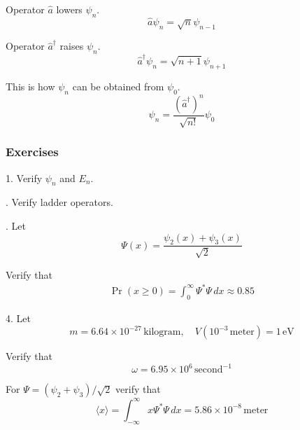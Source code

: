 Operator $\hat a$ lowers $\psi_n$.
\begin{equation*}
\hat a\psi_n=\sqrt n\psi_{n-1}
\end{equation*}

Operator $\hat a^\dag$ raises $\psi_n$.
\begin{equation*}
\hat a^\dag\psi_n=\sqrt{n+1}\psi_{n+1}
\end{equation*}

This is how $\psi_n$ can be obtained from $\psi_0$.
\begin{equation*}
\psi_n=\frac{(\hat a^\dag)^n}{\sqrt{n!}}\psi_0
\end{equation*}

\subsubsection*{Exercises}

1. Verify $\psi_n$ and $E_n$.

. Verify ladder operators.

. Let
\begin{equation*}
\Psi(x)=\frac{\psi_2(x)+\psi_3(x)}{\sqrt2}
\end{equation*}

Verify that
\begin{align*}
\Pr(x\ge0)=\int_0^\infty \Psi^*\Psi\,dx\approx0.85
\end{align*}

4. Let
\begin{equation*}
m=6.64\times10^{-27}\,\text{kilogram},\quad
V(10^{-3}\,\text{meter})=1\,\text{eV}
\end{equation*}

Verify that
\begin{equation*}
\omega=6.95\times10^6\,\text{second}^{-1}
\end{equation*}

For $\Psi=(\psi_2+\psi_3)/\sqrt2$ verify that
\begin{equation*}
\langle x\rangle=\int_{-\infty}^\infty x\Psi^*\Psi\,dx=5.86\times10^{-8}\,\text{meter}
\end{equation*}


